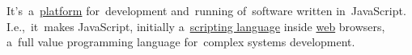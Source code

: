 \label{nodejs}
It's~a~\hyperref[platform]{platform} for~development and~running of~software written in~JavaScript.
I.e.,~it~makes JavaScript, initially a~\hyperref[scriptinglanguages]{scripting language} inside \hyperref[internetweb]{web} browsers, a~full value programming language for~complex systems development.

